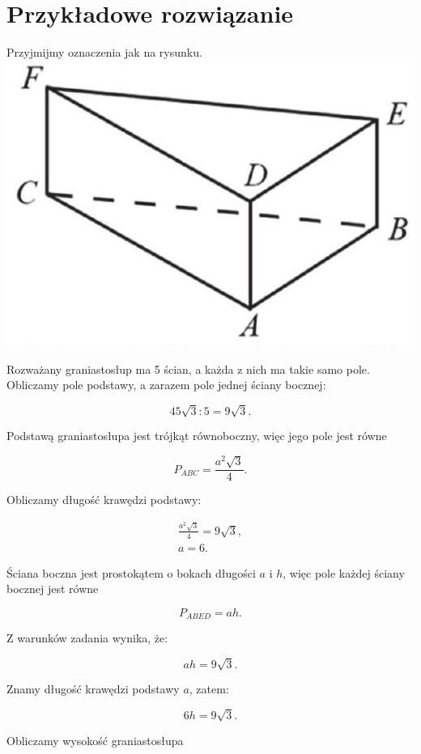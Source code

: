 \documentclass[10pt]{article}
\begin{document}
\section*{Przykładowe rozwiązanie}
Przyjmijmy oznaczenia jak na rysunku.\\
\includegraphics[max width=\textwidth, center]{2025_02_07_a74eed68a1a2147a06fdg-23}

Rozważany graniastosłup ma 5 ścian, a każda z nich ma takie samo pole. Obliczamy pole podstawy, a zarazem pole jednej ściany bocznej:

$$
45 \sqrt{3}: 5=9 \sqrt{3} .
$$

Podstawą graniastosłupa jest trójkąt równoboczny, więc jego pole jest równe

$$
P_{A B C}=\frac{a^{2} \sqrt{3}}{4} .
$$

Obliczamy długość krawędzi podstawy:

$$
\begin{gathered}
\frac{a^{2} \sqrt{3}}{4}=9 \sqrt{3}, \\
a=6 .
\end{gathered}
$$

Ściana boczna jest prostokątem o bokach długości $a$ i $h$, więc pole każdej ściany bocznej jest równe

$$
P_{A B E D}=a h .
$$

Z warunków zadania wynika, że:

$$
a h=9 \sqrt{3} .
$$

Znamy długość krawędzi podstawy $a$, zatem:

$$
6 h=9 \sqrt{3} .
$$

Obliczamy wysokość graniastosłupa
\end{document}
